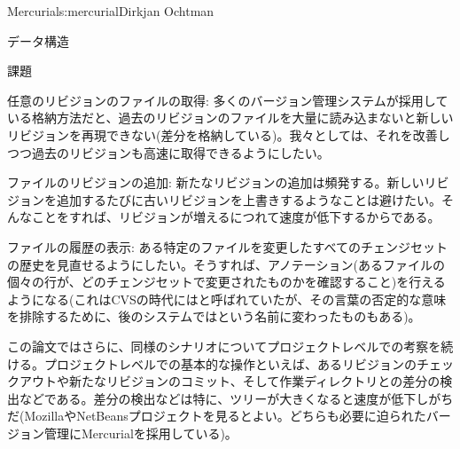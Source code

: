 \begin{aosachapter}{Mercurial}{s:mercurial}{Dirkjan Ochtman}
\begin{aosasect1}{データ構造}
\begin{aosasect2}{課題}
\begin{aosaitemize}
  \item 任意のリビジョンのファイルの取得: 多くのバージョン管理システムが採用している格納方法だと、過去のリビジョンのファイルを大量に読み込まないと新しいリビジョンを再現できない(差分を格納している)。我々としては、それを改善しつつ過去のリビジョンも高速に取得できるようにしたい。

  \item ファイルのリビジョンの追加: 新たなリビジョンの追加は頻発する。新しいリビジョンを追加するたびに古いリビジョンを上書きするようなことは避けたい。そんなことをすれば、リビジョンが増えるにつれて速度が低下するからである。

  \item ファイルの履歴の表示: ある特定のファイルを変更したすべてのチェンジセットの歴史を見直せるようにしたい。そうすれば、アノテーション(あるファイルの個々の行が、どのチェンジセットで変更されたものかを確認すること)を行えるようになる(これはCVSの時代にはと呼ばれていたが、その言葉の否定的な意味を排除するために、後のシステムではという名前に変わったものもある)。

\end{aosaitemize}

この論文ではさらに、同様のシナリオについてプロジェクトレベルでの考察を続ける。プロジェクトレベルでの基本的な操作といえば、あるリビジョンのチェックアウトや新たなリビジョンのコミット、そして作業ディレクトリとの差分の検出などである。差分の検出などは特に、ツリーが大きくなると速度が低下しがちだ(MozillaやNetBeansプロジェクトを見るとよい。どちらも必要に迫られたバージョン管理にMercurialを採用している)。


\end{aosasect2}
\end{aosasect1}
\end{aosachapter}
